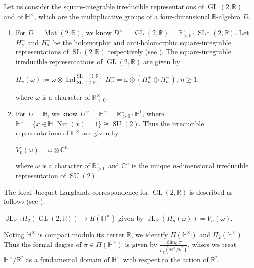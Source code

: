 \documentclass[11pt]{article}
\theoremstyle{plain}
\theoremstyle{remark}
\theoremstyle{definition}
\DeclareMathOperator{\Nm}{Nm}
\DeclareMathOperator{\Ind}{Ind}
\DeclareMathOperator{\SL}{SL}
\DeclareMathOperator{\GL}{GL}
\DeclareMathOperator{\JL}{JL}
\DeclareMathOperator{\SU}{SU}
\DeclareMathOperator{\Mt}{Mat}
\begin{document}
Let us consider the square-integrable irreducible representations of $\GL(2,\mathbb{R})$ and of $\mathbb{H}^{\times}$, which are the multiplicative groups of a four-dimensional $\mathbb{R}$-algebra $D$. 
\begin{enumerate}
    \item For $D=\Mt(2,\mathbb{R})$, we know $D^{\times}=\GL(2,\mathbb{R})=\mathbb{R}^{\times}_{>0}\cdot \SL^{\pm}(2,\mathbb{R})$. 
Let $H_n^+$ and $H_n^-$ be the holomorphic and anti-holomorphic square-integrable representations of $\SL(2,\mathbb{R})$ respectively (see \cite{Kn77GL2}).  
The square-integrable irreducible representations of $\GL(2,\mathbb{R})$ are given by
\begin{center}
    $H_n(\omega):=\omega\otimes \Ind_{\SL(2,\mathbb{R})}^{\SL^{\pm}(2,\mathbb{R})}H_n^+=\omega\otimes(H_n^+\oplus H_n^-)$, $n\geq 1$,
\end{center}
where $\omega$ is a character of $\mathbb{R}^{\times}_{>0}$.
\item For $D=\mathbb{H}$, we know $D^{\times}=\mathbb{H}^{\times}=\mathbb{R}^{\times}_{>0}\cdot \mathbb{H}^1$, where  $\mathbb{H}^1=\{x\in \mathbb{H}|\Nm(x)=1\}\cong\SU(2)$. 
Thus the irreducible representations of $\mathbb{H}^{\times}$ are given by
\begin{center}
    $V_n(\omega)=\omega\otimes \mathbb{C}^n$,
\end{center}
where $\omega$ is a character of $\mathbb{R}^{\times}_{>0}$ and $\mathbb{C}^n$ is the unique $n$-dimensional irreducible representation of $\SU(2)$.
\end{enumerate}

The local Jacquet-Langlands correspondence for $\GL(2,\mathbb{R})$ is described as follows (see \cite[\S 1]{KnRg97tfJL}):
\begin{center}
   $\JL_{\mathbb{R}}\colon \Pi_2(\GL(2,\mathbb{R})) \to \Pi(\mathbb{H}^{\times})$ given by $\JL_{\mathbb{R}}(H_n(\omega))=V_n(\omega)$. 
\end{center} 
Noting $\mathbb{H}^{\times}$ is compact modulo its center $\mathbb{R}$, we identify $\Pi(\mathbb{H}^{\times})$ and $\Pi_2(\mathbb{H}^{\times})$.
Thus the formal degree of $\pi \in \Pi(\mathbb{H}^{\times})$ is given by $\frac{\dim_{\mathbb{C}}\pi}{\mu_{\mathbb{R}}(\mathbb{H}^{\times}/\mathbb{R}^{*})}$, where we treat $\mathbb{H}^{\times}/\mathbb{R}^{*}$ as a fundamental domain of $\mathbb{H}^{\times}$ with respect to the action of $\mathbb{R}^*$. 
\end{document}
